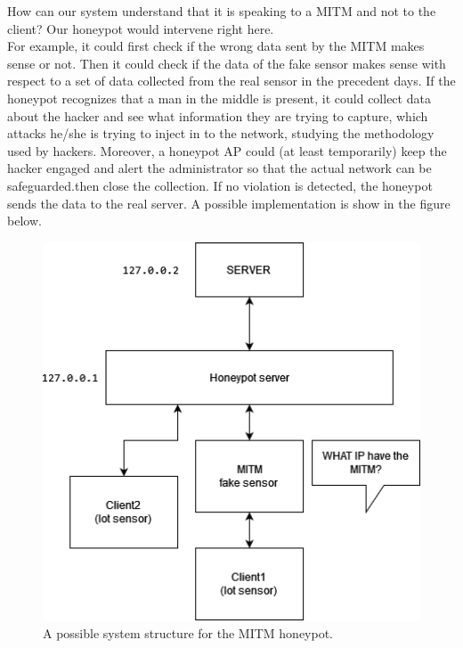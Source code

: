 \noindent How can our system understand that it is speaking to a MITM and not to the client? Our honeypot would intervene right here.\\
For example, it could first check if the wrong data sent by the MITM makes sense or not. Then it could check if the data of the fake sensor makes sense with respect to a set of data collected from the real sensor in the precedent days. If the honeypot recognizes that a man in the middle is present, it could collect data about the hacker and see what information they are trying to capture, which attacks he/she is trying to inject in to the network, studying  the methodology used by hackers. Moreover, a honeypot AP could (at least temporarily) keep the hacker engaged and alert the administrator so that the actual network can be safeguarded.then close the collection. If no violation is detected, the honeypot sends the data to the real server. A possible implementation is show in the figure below.

\begin{figure}[h!]
  \centering
  \includegraphics[width = 15cm]{images/MITMHONEYPOT.drawio.png}
  \caption{A possible system structure for the MITM honeypot.}
  \label{fig:5period}
\end{figure}
\FloatBarrier

